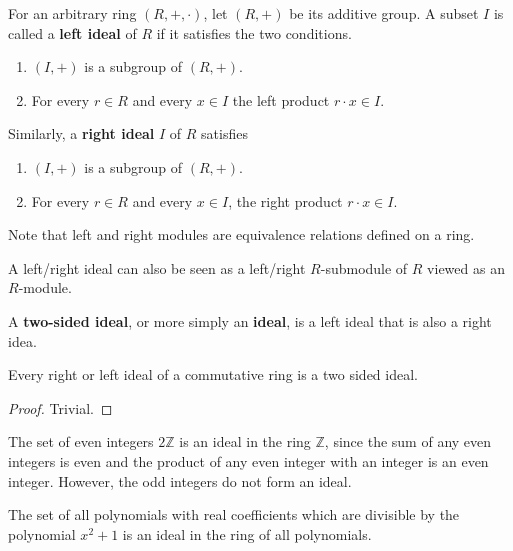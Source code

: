 \documentclass{article}
\begin{document}
    \begin{definition}
      For an arbitrary ring $(R,+, \cdot)$, let $(R, +)$ be its additive group. A subset $I$ is called a \textbf{left ideal} of $R$ if it satisfies the two conditions. 
      \begin{enumerate}
        \item $(I, +)$ is a subgroup of $(R, +)$. 
        \item For every $r \in R$ and every $x \in I$ the left product $r \cdot x \in I$. 
      \end{enumerate}
      Similarly, a \textbf{right ideal} $I$ of $R$ satisfies
      \begin{enumerate}
        \item $(I, +)$ is a subgroup of $(R, +)$. 
        \item For every $r \in R$ and every $x \in I$, the right product $r \cdot x \in I$. 
      \end{enumerate}
      Note that left and right modules are equivalence relations defined on a ring. 
    \end{definition}

    A left/right ideal can also be seen as a left/right $R$-submodule of $R$ viewed as an $R$-module. 

    \begin{definition}
      A \textbf{two-sided ideal}, or more simply an \textbf{ideal}, is a left ideal that is also a right idea. 
    \end{definition}

    \begin{proposition}
      Every right or left ideal of a commutative ring is a two sided ideal. 
    \end{proposition}
    \begin{proof}
      Trivial. 
    \end{proof}

    \begin{example}
      The set of even integers $2 \mathbb{Z}$ is an ideal in the ring $\mathbb{Z}$, since the sum of any even integers is even and the product of any even integer with an integer is an even integer. However, the odd integers do not form an ideal. 
    \end{example}

    \begin{example}
      The set of all polynomials with real coefficients which are divisible by the polynomial $x^2 + 1$ is an ideal in the ring of all polynomials. 
    \end{example}
\end{document}
